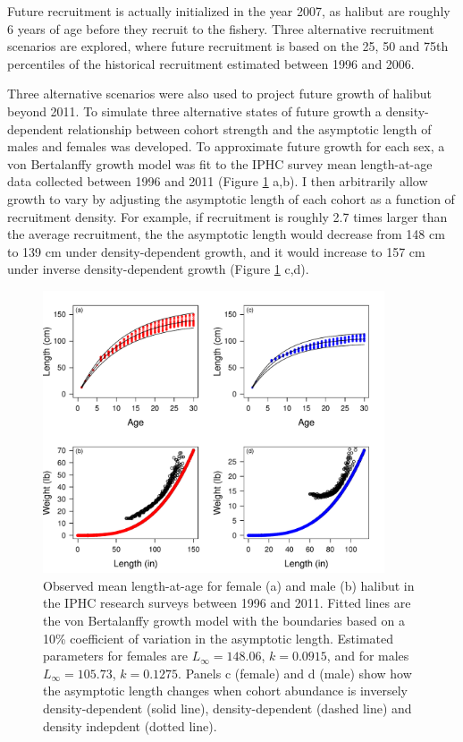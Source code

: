 Future recruitment is actually initialized in the year 2007, as halibut are roughly 6 years of age before they recruit to the fishery. Three alternative recruitment scenarios are explored, where future recruitment is based on the 25, 50 and 75th percentiles of the historical recruitment estimated between 1996 and 2006.

Three alternative scenarios were also used to project future growth of halibut beyond 2011.  To simulate three alternative states of future growth a density-dependent relationship between cohort strength and the asymptotic length of males and females was developed.  To approximate future growth for each sex, a von Bertalanffy growth model was fit to the IPHC survey mean length-at-age data collected between 1996 and 2011 (Figure \ref{fig:FIGURES_figLengthAtAgeFit} a,b).  I then arbitrarily allow growth to vary by adjusting the asymptotic length of each cohort as a function of recruitment density. For example, if recruitment is roughly 2.7 times larger than the average recruitment, the the asymptotic length would decrease from 148 cm to 139 cm under density-dependent growth, and it would increase to 157 cm under inverse density-dependent growth (Figure \ref{fig:FIGURES_figLengthAtAgeFit} c,d).  
   
\begin{figure}[htbp]
	\centering
		\includegraphics[width=0.9\textwidth]{../FIGURES/figLengthAtAgeFit.pdf}
	\caption{Observed mean length-at-age for female (a) and male (b) halibut in the IPHC research surveys between 1996 and 2011. Fitted lines are the von Bertalanffy growth model with the boundaries based on a 10\% coefficient of variation in the asymptotic length. Estimated parameters for females are $L_\infty=148.06$, $k=0.0915$, and for males $L_\infty=105.73$, $k=0.1275$. Panels c  (female) and d (male) show how the asymptotic length changes when cohort abundance is inversely density-dependent (solid line), density-dependent (dashed line) and density indepdent (dotted line).}
	\label{fig:FIGURES_figLengthAtAgeFit}
\end{figure}




